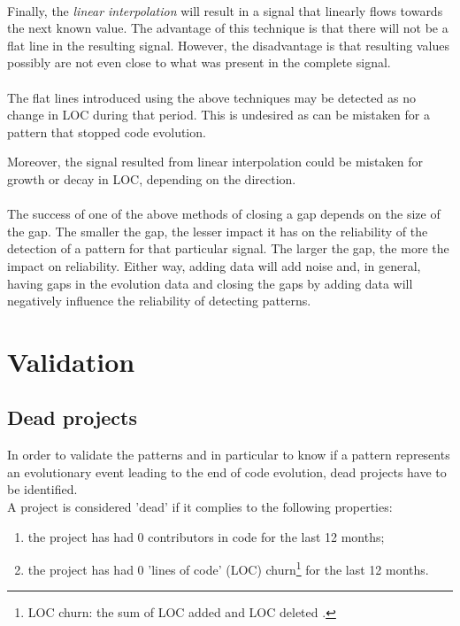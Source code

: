 \paragraph{}
Finally, the \textit{linear interpolation} will result in a signal that
linearly flows towards the next known value. The advantage of this technique is
that there will not be a flat line in the resulting signal. However, the
disadvantage is that resulting values possibly are not even close to what was
present in the complete signal.

\paragraph{}
The flat lines introduced using the above techniques may be detected as no
change in LOC during that period. This is undesired as can be mistaken for a
pattern that stopped code evolution.

Moreover, the signal resulted from linear interpolation could be mistaken for
growth or decay in LOC, depending on the direction.

\paragraph{}
The success of one of the above methods of closing a gap depends on the size of
the gap. The smaller the gap, the lesser impact it has on the reliability of
the detection of a pattern for that particular signal. The larger the gap, the
more the impact on reliability. Either way, adding data will add noise and, in
general, having gaps in the evolution data and closing the gaps by adding data
will negatively influence the reliability of detecting patterns.

\section{Validation}
\subsection{Dead projects}
\label{method:validation}
In order to validate the patterns and in particular to know if a pattern
represents an evolutionary event leading to the end of code evolution, dead
projects have to be identified.\\

\noindent
\label{def:dead}
A project is considered 'dead' if it complies to the following properties:
\begin{enumerate}
	\item the project has had 0 contributors in code for the last 12 months;
	\item the project has had 0 'lines of code' (LOC) churn\footnote{LOC churn:
	the sum of LOC added and LOC deleted \cite{elbaum}.} for the last 12 months.
\end{enumerate}

